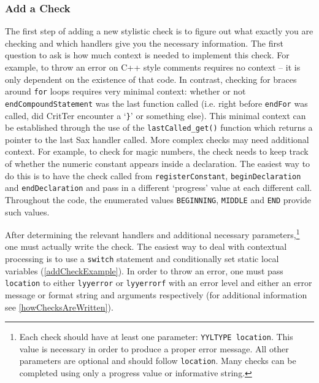 \documentclass[12pt]{report}
\newcommand{\programName}{CritTer\xspace}
\begin{document}
\subsubsection{Add a Check}

The first step of adding a new stylistic check is to figure out what exactly you are checking and which 
handlers give you the necessary information. The first question to ask is how much context is needed to 
implement this check. For example, to throw an error on C++ style comments requires no context -- it is 
only dependent on the existence of that code. In contrast, checking for braces around \lstinline{for} loops 
requires very minimal context: whether or not \lstinline{endCompoundStatement} was the last function 
called (i.e. right before \lstinline{endFor} was called, did \programName encounter a `\lstinline!}!' or 
something else). This minimal context can be established through the use of the 
\lstinline{lastCalled_get()} function which returns a pointer to the last Sax handler called. More complex 
checks may need additional context. For example, to check for magic numbers, the check needs to keep 
track of whether the numeric constant appears inside a declaration. The easiest way to do this is to have 
the check called from \lstinline{registerConstant}, \lstinline{beginDeclaration} and 
\lstinline{endDeclaration} and pass in a different `progress' value at each different call. Throughout the 
code, the enumerated values \lstinline{BEGINNING}, \lstinline{MIDDLE} and \lstinline{END} provide 
such values.

After determining the relevant handlers and additional necessary parameters,\footnote{Each check 
should have at least one parameter: \lstinline{YYLTYPE location}. This value is necessary in order to 
produce a proper error message. All other parameters are optional and should follow \lstinline{location}. 
Many checks can be completed using only a progress value or informative string.} one must actually 
write the check. The easiest way to deal with contextual processing is to use a \lstinline{switch} 
statement and conditionally set static local variables (\autoref{addCheckExample}). In order to 
throw an error, one must pass \lstinline{location} to either \lstinline{lyyerror} or \lstinline{lyyerrorf} with an 
error level and either an error message or format string and arguments respectively (for additional 
information see \autoref{howChecksAreWritten}).
\end{document}
